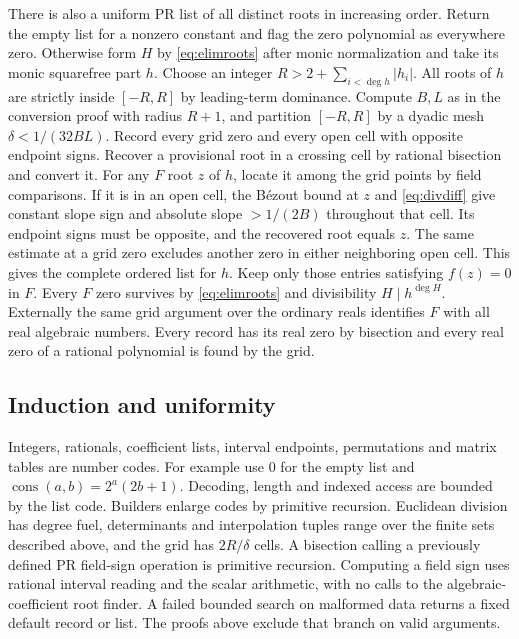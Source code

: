 There is also a uniform PR list of all distinct roots in increasing order.
Return the empty list for a nonzero constant and flag the zero polynomial
as everywhere zero. Otherwise form $H$ by \eqref{eq:elimroots} after
monic normalization and take its monic squarefree part $h$. Choose
an integer $R>2+\sum_{i<\deg h}|h_i|$. All roots of $h$ are strictly
inside $[-R,R]$ by leading-term dominance. Compute $B,L$ as in the
conversion proof with radius $R+1$, and partition $[-R,R]$ by a dyadic
mesh $\delta<1/(32BL)$. Record every grid zero and every open cell
with opposite endpoint signs. Recover a provisional root in a crossing
cell by rational bisection and convert it. For any $F$ root $z$ of $h$,
locate it among the grid points by field comparisons. If it is in an
open cell, the B\'ezout bound at $z$ and \eqref{eq:divdiff} give constant
slope sign and absolute slope $>1/(2B)$ throughout that cell. Its endpoint
signs must be opposite, and the recovered root equals $z$. The same
estimate at a grid zero excludes another zero in either neighboring open
cell. This gives the complete ordered list for $h$. Keep only those
entries satisfying $f(z)=0$ in $F$. Every $F$ zero survives by
\eqref{eq:elimroots} and divisibility $H\mid h^{\deg H}$. Externally
the same grid argument over the ordinary reals identifies $F$ with all
real algebraic numbers. Every record has its real zero by bisection
and every real zero of a rational polynomial is found by the grid.

\subsection{Induction and uniformity}
Integers, rationals, coefficient lists, interval endpoints, permutations
and matrix tables are number codes. For example use $0$ for the empty
list and $\operatorname{cons}(a,b)=2^a(2b+1)$. Decoding, length and
indexed access are bounded by the list code. Builders enlarge codes by
primitive recursion. Euclidean division has degree fuel, determinants
and interpolation tuples range over the finite sets described above,
and the grid has $2R/\delta$ cells. A bisection calling a previously
defined PR field-sign operation is primitive recursion. Computing a field
sign uses rational interval reading and the scalar arithmetic, with no
calls to the algebraic-coefficient root finder. A failed bounded search
on malformed data returns a fixed default record or list. The proofs
above exclude that branch on valid arguments.

